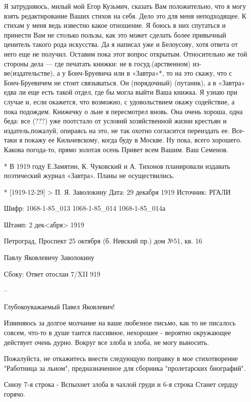 Я затрудняюсь, милый мой Егор Кузьмич, сказать Вам положительно, что я могу взять редактирование Ваших стихов на себя. Дело это для меня неподходящее. К стихам у меня ведь известно какое отношение. Я боюсь в них спутаться и принести Вам не столько пользы, как это может сделать более привычный ценитель такого рода искусства. Да я написал уже и Белоусову, хотя ответа от него еще не получил.  Оставим пока этот вопрос открытым. Относительно же той стороны дела — где печатать книжки: не в госуд.(арственном) из-ве(издательстве), а у Бонч-Бруевича или в «Завтра»*, то на это скажу, что с Бонч-Бруевичем не стоит связываться. Он (порядочный) (путаник), а в «Завтра» едва ли еще есть такой отдел, где бы могла выйти Ваша книжка. Я узнаю при случае и, если окажется, что возможно, с удовольствием окажу содействие, а пока подождем. Книжечку о льне я пересмотрел вновь. Она очень хороша, одна беда: все (???) уже поотстало от условий хозяйственной жизни крестьян и издатель,пожалуй, опираясь на это, не так охотно согласится переиздать ее. Все-таки я покажу ее Кильчевскому, когда буду в Москве.
Ну пока, всего хорошего. Какова погода-то, прямо золотая осень
Привет всем Вашим.
Ваш Семенов.

   * В 1919 году Е.Замятин, К. Чуковский и А. Тихонов планировали издавать поэтический журнал «Завтра». Планы  не осуществились. 


* [1919-12-29] > П. Я. Заволокину 
Дата: 29 декабря 1919
Источник: РГАЛИ

Шифр:   1068-1-85_013
        1068-1-85_014
        1068-1-85_014а

Штамп: 2 дек<абря> 1919

Петроград, Проспект 25 октября (б. Невский пр.) дом №51, кв. 16

Павлу Яковлевичу Заволокину

Сбоку: Ответ отослан 7/XII 919

--

Глубокоуважаемый Павел Яковлевич!

Извиняюсь за долгое молчание на ваше любезное письмо, как то не писалось совсем, что-то в душе таится пассивное, нехорошее - вероятно окружающее действует очень дурно. Вокруг все злоба и злоба, не могу выносить.

Пожалуйста, не откажитесь внести следующую поправку в мое стихотворение "Работница за льном", предназначенное для сборника "пролетарских биографий".

Снизу 7-я строка -
Вспыхнет злоба в чахлой груди
и 6-я строка
Станет сердцу горячо.

